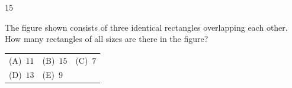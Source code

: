 \documentclass[11pt]{article}
\makeatletter
\newcommand{\choicesII}[5]{\par\smallskip\noindent
  \begin{tabularx}{\linewidth}{@{}XXX@{}}(A)\ #1&(B)\ #2&(C)\ #3\\(D)\ #4&(E)\ #5&\end{tabularx}\par}
\makeatother
\begin{document}
\begin{probbox}{15}{\relax}
\begin{minipage}[t]{0.52\linewidth}\vspace{0pt}
The figure shown consists of three identical rectangles overlapping each other. How many rectangles of all sizes are there in the figure?
\choicesII{$11$}{$15$}{$7$}{$13$}{$9$}
\end{minipage}\hfill
\begin{minipage}[t]{0.44\linewidth}\vspace{0pt}
\centering{}
\end{minipage}
\end{probbox}
\end{document}
